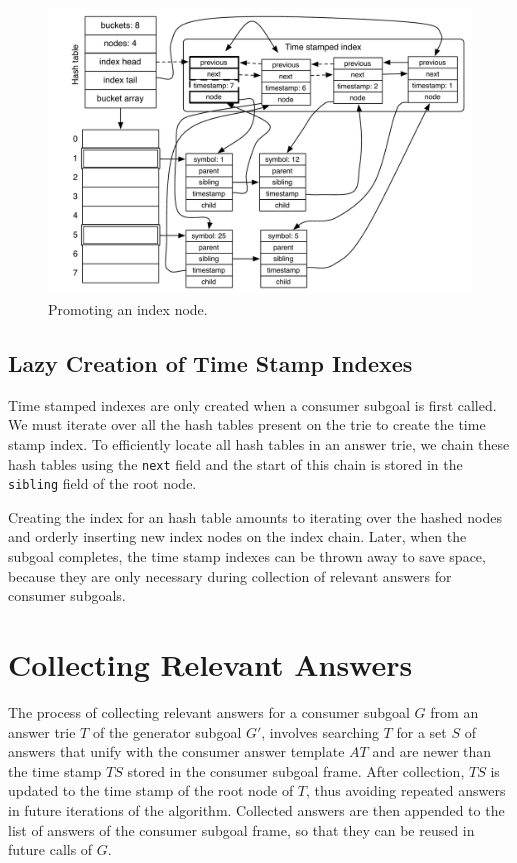 \begin{figure}[ht]
  \centering
    \includegraphics[scale=0.6]{hash_table_promote.pdf}
  \caption{Promoting an index node.}
  \label{fig:hash_table_promote}
\end{figure}

\subsection{Lazy Creation of Time Stamp Indexes}

Time stamped indexes are only created when a consumer subgoal is first called.
We must iterate over all the hash tables present on the trie to create the time stamp index.
To efficiently locate all hash tables in an answer trie, we chain these hash tables
using the \texttt{next} field and the start of this chain is stored
in the \texttt{sibling} field of the root node.

Creating the index for an hash table amounts to iterating over the hashed nodes
and orderly inserting new index nodes on the index chain.
Later, when the subgoal completes, the time stamp indexes can be thrown away to save space,
because they are only necessary during collection of relevant answers for consumer subgoals.

\section{Collecting Relevant Answers}\label{sec:collect}

The process of collecting relevant answers for a consumer subgoal $G$ from an answer trie $T$
of the generator subgoal $G'$, involves searching $T$ for a set $S$ of answers that unify
with the consumer answer template $AT$ and are newer than the time stamp
$TS$ stored in the consumer subgoal frame. After collection, $TS$ is updated to the
time stamp of the root node of $T$, thus avoiding repeated answers in future iterations
of the algorithm. Collected answers are then appended to the list of answers of the consumer
subgoal frame, so that they can be reused in future calls of $G$.

